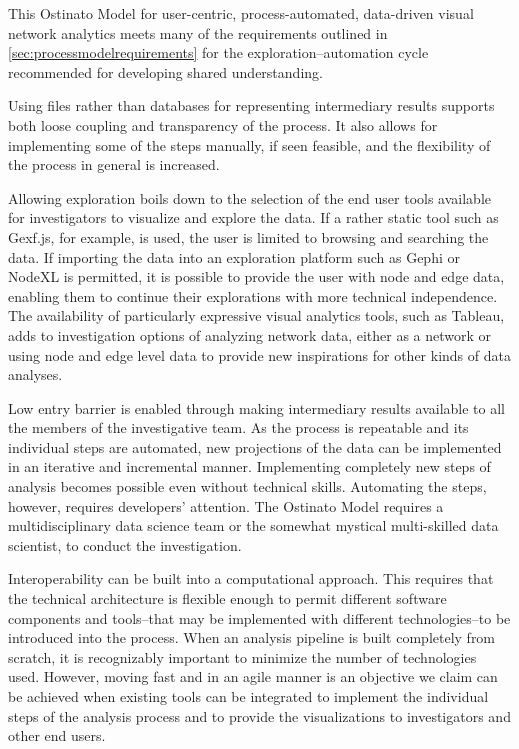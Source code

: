 This Ostinato Model for user-centric, process-automated, data-driven visual network analytics meets many of the requirements outlined in \ref{sec:processmodelrequirements} for the exploration–automation cycle recommended for developing shared understanding.

Using files rather than databases for representing intermediary results supports both loose coupling and transparency of the process. It also allows for implementing some of the steps manually, if seen feasible, and the flexibility of the process in general is increased.

Allowing exploration boils down to the selection of the end user tools available for investigators to visualize and explore the data. If a rather static tool such as Gexf.js, for example, is used, the user is limited to browsing and searching the data. If importing the data into an exploration platform such as Gephi or NodeXL is permitted, it is possible to provide the user with node and edge data, enabling them to continue their explorations with more technical independence. The availability of particularly expressive visual analytics tools, such as Tableau, adds to investigation options of analyzing network data, either as a network or using node and edge level data to provide new inspirations for other kinds of data analyses.

Low entry barrier is enabled through making intermediary results available to all the members of the investigative team. As the process is repeatable and its individual steps are automated, new projections of the data can be implemented in an iterative and incremental manner. Implementing completely new steps of analysis becomes possible even without technical skills. Automating the steps, however, requires developers’ attention. The Ostinato Model requires a multidisciplinary data science team or the somewhat mystical multi-skilled data scientist, \citep[cf.][]{Davenport2014BigOpportunities} to conduct the investigation.

Interoperability can be built into a computational approach. This requires that the technical architecture is flexible enough to permit different software components and tools--that may be implemented with different technologies--to be introduced into the process. When an analysis pipeline is built completely from scratch, it is recognizably important to minimize the number of technologies used. However, moving fast and in an agile manner is an objective we claim can be achieved when existing tools can be integrated to implement the individual steps of the analysis process and to provide the visualizations to investigators and other end users.

